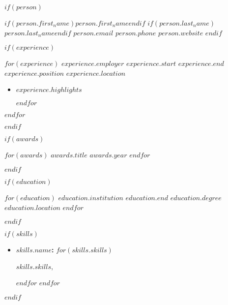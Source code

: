 $if(person)$
\def \fullName{%
  $if(person.first_name)$$person.first_name$$endif$
  $if(person.last_name)$$person.last_name$$endif$
}

\header
    {\fullName}
    {$person.email$}
    {$person.phone$}
    {$person.website$}
$endif$

$if(experience)$

\begin{itemize}[label={}, leftmargin=*]
    $for(experience)$
    \experience
        {$experience.employer$}
        {$experience.start$}
        {$experience.end$}
        {$experience.position$}
        {$experience.location$}

    \begin{itemize}
      $for(experience.highlights)$
        \item
            \begin{small}
                $experience.highlights$
            \end{small}
        $endfor$
    \end{itemize}
    $endfor$
\end{itemize}
$endif$

$if(awards)$

\begin{itemize}[label={}, leftmargin=*]
    $for(awards)$
    \award
        {$awards.title$}
        {$awards.year$}
    $endfor$
\end{itemize}
$endif$

$if(education)$

\begin{itemize}[label={}, leftmargin=*]
    $for(education)$
    \education
        {$education.institution$}
        {$education.end$}
        {$education.degree$}
        {$education.location$}
    $endfor$
\end{itemize}
$endif$

$if(skills)$

\begin{itemize}[label={}, leftmargin=*, nosep]
    $for(skills)$
        \item \textbf{$skills.name$:}
          $for(skills.skills)$
            \begin{small}%
                $skills.skills$,%
            \end{small}
          $endfor$
    $endfor$
\end{itemize}
$endif$
